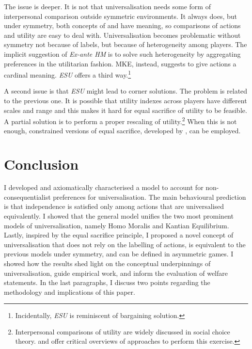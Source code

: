 The issue is deeper. It is not that universalisation needs some form of interpersonal comparison outside symmetric environments. It always does, but under symmetry, both concepts of  and  have meaning, so comparisons of actions and utility are easy to deal with. Universalisation becomes problematic without symmetry not because of labels, but because of heterogeneity among players. The implicit suggestion of \textit{Ex-ante HM} is to solve such heterogeneity by aggregating preferences in the utilitarian fashion. MKE, instead, suggests to give actions a cardinal meaning. \textit{ESU} offers a third way.\footnote{Incidentally, \textit{ESU} is reminiscent of \cite{kalaiOtherSolutionsNashs1975} bargaining solution.}

A second issue is that \textit{ESU} might lead to corner solutions. The problem is related to the previous one. It is possible that utility indexes across players have different scales and range and this makes it hard for equal sacrifice of utility to be feasible. A partial solution is to perform a proper rescaling of utility.\footnote{Interpersonal comparisons of utility are widely discussed in social choice theory. \citet[Ch. 4]{binmoreGameTheorySocial1994a} and \citet[Ch. 7]{senCollectiveChoiceSocial2017} offer critical overviews of approaches to perform this exercise.} When this is not enough, constrained versions of equal sacrifice, developed by \cite{stovallEqualSacrificeTaxation2020}, can be employed.

\section{Conclusion}\label{sec:conclusionuniv}

I developed and axiomatically characterised a model to account for non-consequentialist preferences for universalisation. The main behavioural prediction is that independence is satisfied only among actions that are universalised equivalently. I showed that the general model unifies the two most prominent models of universalisation, namely Homo Moralis and Kantian Equilibrium. Lastly, inspired by the equal sacrifice principle, I proposed a novel concept of universalisation that does not rely on the labelling of actions, is equivalent to the previous models under symmetry, and can be defined in asymmetric games. I showed how the results shed light on the conceptual underpinnings of universalisation, guide empirical work, and inform the evaluation of welfare statements. In the last paragraphs, I discuss two points regarding the methodology and implications of this paper.

